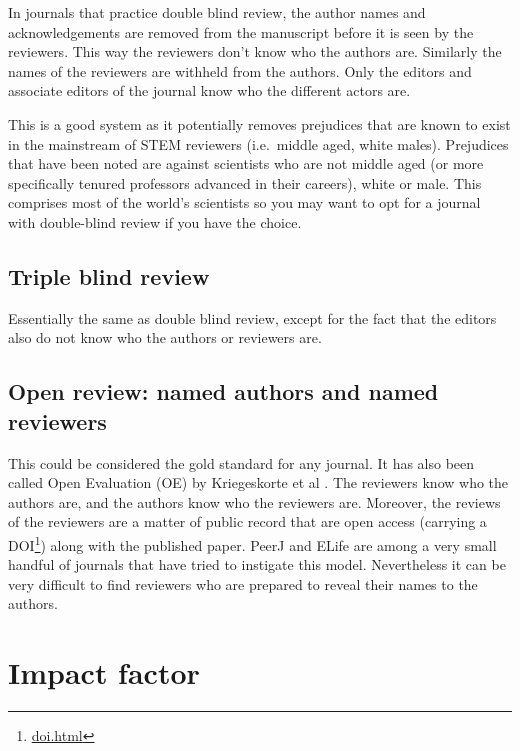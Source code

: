 \documentclass[
]{krantz}
\renewcommand{\href}[2]{#2\footnote{\url{#1}}}
\begin{document}
In journals that practice double blind review, the author names and acknowledgements are removed from the manuscript before it is seen by the reviewers. This way the reviewers don't know who the authors are. Similarly the names of the reviewers are withheld from the authors. Only the editors and associate editors of the journal know who the different actors are.

This is a good system as it potentially removes prejudices that are known to exist in the mainstream of STEM reviewers (i.e.~middle aged, white males). Prejudices that have been noted are against scientists who are not middle aged (or more specifically tenured professors advanced in their careers), white or male. This comprises most of the world's scientists so you may want to opt for a journal with double-blind review if you have the choice.

\hypertarget{triple-blind-review}{%
\subsection{Triple blind review}\label{triple-blind-review}}

Essentially the same as double blind review, except for the fact that the editors also do not know who the authors or reviewers are.

\hypertarget{open-review-named-authors-and-named-reviewers}{%
\subsection{Open review: named authors and named reviewers}\label{open-review-named-authors-and-named-reviewers}}

This could be considered the gold standard for any journal. It has also been called Open Evaluation (OE) by Kriegeskorte et al \citeyearpar{kriegeskorte2012emerging}. The reviewers know who the authors are, and the authors know who the reviewers are. Moreover, the reviews of the reviewers are a matter of public record that are open access (carrying a \href{doi.html}{DOI}) along with the published paper. PeerJ and ELife are among a very small handful of journals that have tried to instigate this model. Nevertheless it can be very difficult to find reviewers who are prepared to reveal their names to the authors.

\hypertarget{impact-factor}{%
\section{Impact factor}\label{impact-factor}}
\end{document}
